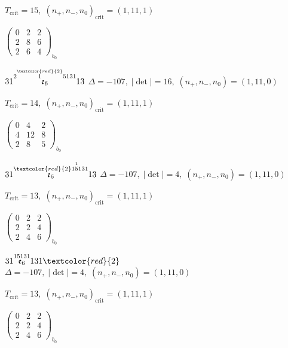 \documentclass[10pt]{article}
\begin{document}
\hspace{1em}$T_{\text{crit}}=15,\; (n_+,n_-,n_0)_{\text{crit}}=(1,11,1)$

\hspace{2em}$\left(\begin{smallmatrix}0 & 2 & 2 \\ 2 & 8 & 6 \\ 2 & 6 & 4\end{smallmatrix}\right)_{\!b_0}$

\smallskip

$31\overset{2\overset{\textcolor{red}{2}}{1}5131}{\mathfrak{e}_6}13$ \quad $\Delta=-107,\; |\det|=16,\; (n_+,n_-,n_0)=(1,11,0)$

\hspace{1em}$T_{\text{crit}}=14,\; (n_+,n_-,n_0)_{\text{crit}}=(1,11,1)$

\hspace{2em}$\left(\begin{smallmatrix}0 & 4 & 2 \\ 4 & 12 & 8 \\ 2 & 8 & 5\end{smallmatrix}\right)_{\!b_0}$

\smallskip

$31\overset{\textcolor{red}{2}1\overset{1}{5}131}{\mathfrak{e}_6}13$ \quad $\Delta=-107,\; |\det|=4,\; (n_+,n_-,n_0)=(1,11,0)$

\hspace{1em}$T_{\text{crit}}=13,\; (n_+,n_-,n_0)_{\text{crit}}=(1,11,1)$

\hspace{2em}$\left(\begin{smallmatrix}0 & 2 & 2 \\ 2 & 2 & 4 \\ 2 & 4 & 6\end{smallmatrix}\right)_{\!b_0}$

\smallskip

$31\overset{15131}{\mathfrak{e}_6}131\textcolor{red}{2}$ \quad $\Delta=-107,\; |\det|=4,\; (n_+,n_-,n_0)=(1,11,0)$

\hspace{1em}$T_{\text{crit}}=13,\; (n_+,n_-,n_0)_{\text{crit}}=(1,11,1)$

\hspace{2em}$\left(\begin{smallmatrix}0 & 2 & 2 \\ 2 & 2 & 4 \\ 2 & 4 & 6\end{smallmatrix}\right)_{\!b_0}$
\end{document}
